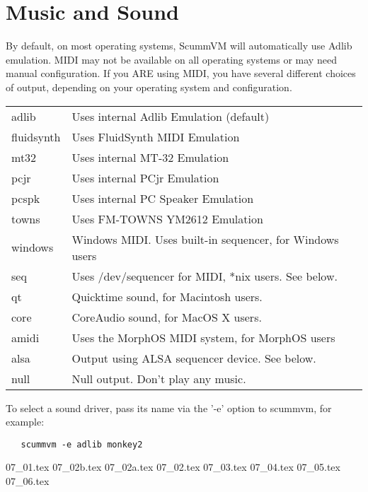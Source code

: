 

\section{Music and Sound} \label{sect-music-and-sound}
By default, on most operating systems, ScummVM will automatically use Adlib
emulation. MIDI may not be available on all operating systems or may need
manual configuration. If you ARE using MIDI, you have several different
choices of output, depending on your operating system and configuration.

\begin{tabular}[h]{ll}
  adlib      & Uses internal Adlib Emulation (default)\\
  fluidsynth & Uses FluidSynth MIDI Emulation\\
  mt32       & Uses internal MT-32 Emulation\\
  pcjr       & Uses internal PCjr Emulation \\
  pcspk      & Uses internal PC Speaker Emulation\\
  towns      & Uses FM-TOWNS YM2612 Emulation\\
  windows    & Windows MIDI. Uses built-in sequencer, for Windows users\\
  seq        & Uses /dev/sequencer for MIDI, *nix users. See below.\\
  qt         & Quicktime sound, for Macintosh users.\\
  core       & CoreAudio sound, for MacOS X users.\\
  amidi      & Uses the MorphOS MIDI system, for MorphOS users\\
  alsa       & Output using ALSA sequencer device. See below.\\
  null       & Null output. Don't play any music.\\
\end{tabular}

To select a sound driver, pass its name via the '-e' option to scummvm,
for example:
\begin{verbatim}
   scummvm -e adlib monkey2
\end{verbatim}

 {07_01.tex}
 {07_02b.tex}
 {07_02a.tex}
 {07_02.tex}
 {07_03.tex}
 {07_04.tex}
 {07_05.tex}
 {07_06.tex}
